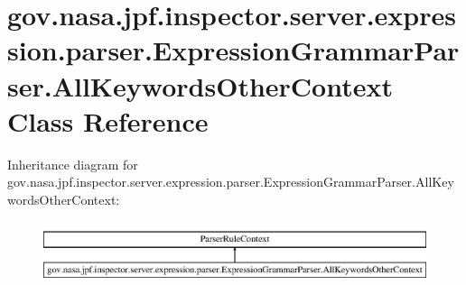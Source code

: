 \hypertarget{classgov_1_1nasa_1_1jpf_1_1inspector_1_1server_1_1expression_1_1parser_1_1_expression_grammar_pacb3381aaee949f84c436ba6b73657885}{}\section{gov.\+nasa.\+jpf.\+inspector.\+server.\+expression.\+parser.\+Expression\+Grammar\+Parser.\+All\+Keywords\+Other\+Context Class Reference}
\label{classgov_1_1nasa_1_1jpf_1_1inspector_1_1server_1_1expression_1_1parser_1_1_expression_grammar_pacb3381aaee949f84c436ba6b73657885}
Inheritance diagram for gov.\+nasa.\+jpf.\+inspector.\+server.\+expression.\+parser.\+Expression\+Grammar\+Parser.\+All\+Keywords\+Other\+Context\+:\begin{figure}[H]
\begin{center}
\leavevmode
\includegraphics[height=1.876047cm]{classgov_1_1nasa_1_1jpf_1_1inspector_1_1server_1_1expression_1_1parser_1_1_expression_grammar_pacb3381aaee949f84c436ba6b73657885}
\end{center}
\end{figure}
